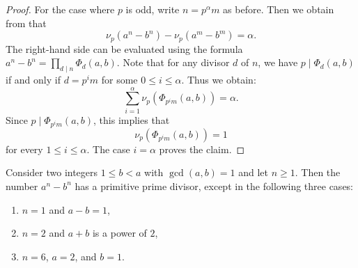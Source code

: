 \begin{proof}
  For the case where $p$ is odd, write $n=p^\alpha m$ as before. Then we obtain from  that
  \begin{equation*}
    \nu_p(a^n-b^n)-\nu_p(a^m-b^m)=\alpha.
  \end{equation*}
  The right-hand side can be evaluated using the formula $a^n-b^n=\prod_{d\mid n}\Phi_d(a,b)$. Note that for any divisor $d$ of $n$, we have $p\mid\Phi_d(a,b)$ if and only if $d=p^im$ for some $0\leq i\leq \alpha$. Thus we obtain:
  \begin{equation*}
    \sum_{i=1}^\alpha \nu_p(\Phi_{p^im}(a,b))=\alpha.
  \end{equation*}
  Since $p\mid \Phi_{p^im}(a,b)$, this implies that
  \begin{equation*}
    \nu_p(\Phi_{p^im}(a,b))=1
  \end{equation*}
  for every $1\leq i\leq \alpha$. The case $i=\alpha$ proves the claim. 
\end{proof}

\begin{theorem}\label{theorem:zsigmondy}
  Consider two integers $1\leq b<a$ with $\gcd(a,b)=1$ and let $n\geq 1$. Then the number $a^n-b^n$ has a primitive prime divisor, except in the following three cases:
  \begin{enumerate}
  \item $n=1$ and $a-b=1$,
  \item $n=2$ and $a+b$ is a power of $2$,
  \item $n=6$, $a=2$, and $b=1$.
  \end{enumerate}
\end{theorem}

